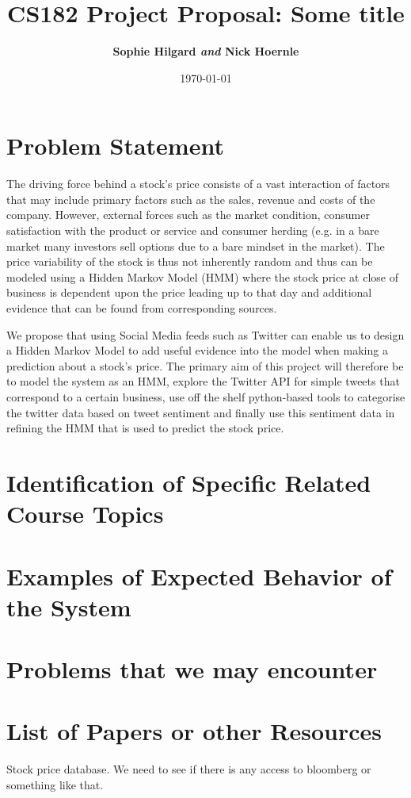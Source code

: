 \documentclass[11pt]{article}
\title{
\vspace{1cm}
\textmd{\textbf{CS182 Project Proposal: Some title}}\\
}
\author{\textbf{Sophie Hilgard \textit{and} Nick Hoernle}}
\date{\today} %
\begin{document}

\maketitle

\lstset{language=Python, basicstyle=\footnotesize} %

\section*{Problem Statement}
The driving force behind a stock's price consists of a vast interaction of factors that may include primary factors such as the sales, revenue and costs of the company. However, external forces such as the market condition, consumer satisfaction with the product or service and consumer herding (e.g. in a bare market many investors sell options due to a bare mindset in the market). The price variability of the stock is thus not inherently random and thus can be modeled using a Hidden Markov Model (HMM) where the stock price at close of business is dependent upon the price leading up to that day and additional evidence that can be found from corresponding sources.\\
\par We propose that using Social Media feeds such as Twitter can enable us to design a Hidden Markov Model to add useful evidence into the model when making a prediction about a stock's price. The primary aim of this project will therefore be to model the system as an HMM, explore the Twitter API for simple tweets that correspond to a certain business, use off the shelf python-based tools to categorise the twitter data based on tweet sentiment and finally use this sentiment data in refining the HMM that is used to predict the stock price.

\section{Identiﬁcation of Speciﬁc Related Course Topics}

\section{Examples of Expected Behavior of the System}

\section{Problems that we may encounter}

\section{List of Papers or other Resources}
Stock price database. We need to see if there is any access to bloomberg or something like that.
\end{document}
